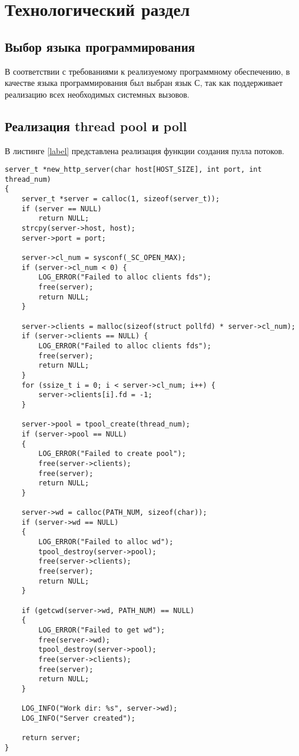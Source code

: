 \chapter{Технологический раздел}

\section{Выбор языка программирования} 
В соответствии с требованиями к реализуемому программному обеспечению, в качестве языка программирования был выбран язык С, так как поддерживает реализацию всех необходимых системных вызовов.



\section{Реализация thread pool и poll} 
В листинге \ref{label} представлена реализация функции создания пулла потоков.

\begin{lstlisting}[caption=Функции создания пулла потоков, label={label}]
server_t *new_http_server(char host[HOST_SIZE], int port, int thread_num)
{
	server_t *server = calloc(1, sizeof(server_t));
	if (server == NULL)
		return NULL;
	strcpy(server->host, host);
	server->port = port;

	server->cl_num = sysconf(_SC_OPEN_MAX);
	if (server->cl_num < 0) {
		LOG_ERROR("Failed to alloc clients fds");
		free(server);
		return NULL;
	}

	server->clients = malloc(sizeof(struct pollfd) * server->cl_num);
	if (server->clients == NULL) {
		LOG_ERROR("Failed to alloc clients fds");
		free(server);
		return NULL;
	}
	for (ssize_t i = 0; i < server->cl_num; i++) {
		server->clients[i].fd = -1;
	}

	server->pool = tpool_create(thread_num);
	if (server->pool == NULL)
	{
		LOG_ERROR("Failed to create pool");
		free(server->clients);
		free(server);
		return NULL;
	}

	server->wd = calloc(PATH_NUM, sizeof(char));
	if (server->wd == NULL)
	{
		LOG_ERROR("Failed to alloc wd");
		tpool_destroy(server->pool);
		free(server->clients);
		free(server);
		return NULL;
	}

	if (getcwd(server->wd, PATH_NUM) == NULL)
	{
		LOG_ERROR("Failed to get wd");
		free(server->wd);
		tpool_destroy(server->pool);
		free(server->clients);
		free(server);
		return NULL;
	}

	LOG_INFO("Work dir: %s", server->wd);
	LOG_INFO("Server created");

	return server;
}

\end{lstlisting}



